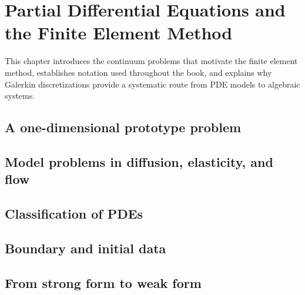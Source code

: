 \chapter[Partial Differential Equations and FEM]{Partial Differential Equations and the Finite Element Method}
\label{ch:fem_intro}

This chapter introduces the continuum problems that motivate the finite element
method, establishes notation used throughout the book, and explains why
Galerkin discretizations provide a systematic route from PDE models to
algebraic systems.

\section{A one-dimensional prototype problem}
\label{sec:fem_intro:prototype}


\section{Model problems in diffusion, elasticity, and flow}
\label{sec:fem_intro:model}


\section{Classification of PDEs}
\label{sec:fem_intro:classification}


\section{Boundary and initial data}
\label{sec:fem_intro:data}


\section{From strong form to weak form}
\label{sec:fem_intro:strong_to_weak}

